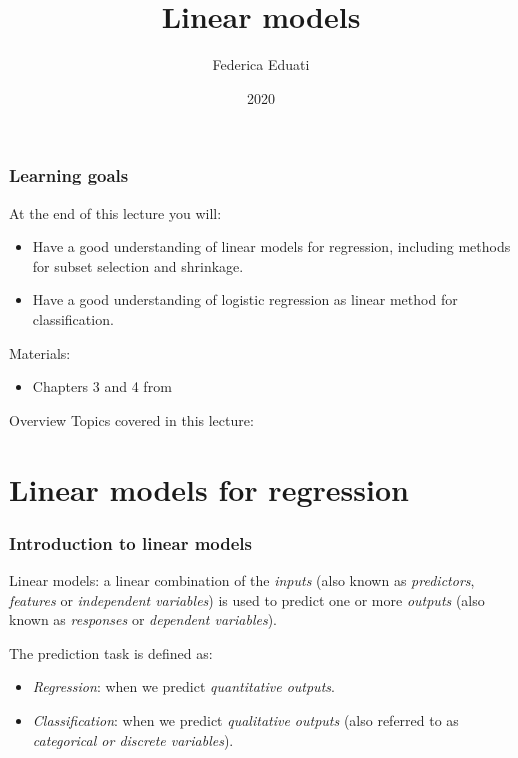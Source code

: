 \documentclass[notes]{beamer}          %
\title{Linear models}
\author{Federica Eduati}
\institute{Eindhoven University of Technology

Department of Biomedical Engineering}
\date{2020}
\begin{document}
 
\frame{\titlepage}
 
\begin{frame}
\frametitle{Learning goals}

At the end of this lecture you will:
\begin{itemize}
    \item Have a good understanding of linear models for regression, including methods for subset selection and shrinkage. 
    \item Have a good understanding of logistic regression as linear method for classification.
\end{itemize}

\vspace{5mm} 

Materials: 
\begin{itemize}
    \item Chapters 3 and 4 from \cite{elements}
\end{itemize}

\end{frame}


\begin{frame}{Overview}
Topics covered in this lecture:
    \tableofcontents
\end{frame}


\section{Linear models for regression}


\begin{frame}
\frametitle{Introduction to linear models}
Linear models: a linear combination of the \textit{inputs} (also known as \textit{predictors}, \textit{features} or \textit{independent variables}) is used to predict one or more \textit{outputs} (also known as \textit{responses} or \textit{dependent variables}).

\vspace{5mm} 

The prediction task is defined as:
\begin{itemize}
    \item \textit{Regression}: when we predict \textit{quantitative outputs}.
    \item \textit{Classification}: when we predict \textit{qualitative outputs} (also referred to as \textit{categorical or discrete variables}).
\end{itemize}

\end{frame}
\end{document}
